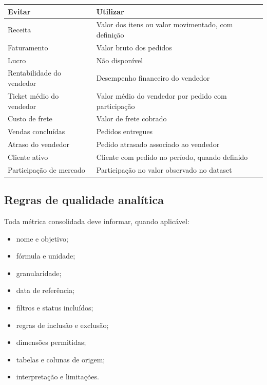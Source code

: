 \documentclass[12pt,a4paper]{article}
\newcounter{none}
\providecommand{\tightlist}{
  \setlength{\itemsep}{0pt}\setlength{\parskip}{0pt}
}
\begin{document}
{\def\LTcaptype{none} %
\begin{longtable}[]{@{}
  >{\raggedright\arraybackslash}p{}
  >{\raggedright\arraybackslash}p{}@{}}
\toprule\noalign{}
\rowcolor{AzulCorporativo}
\begin{minipage}[b]{\linewidth}\raggedright\color{white}\bfseries
Evitar
\end{minipage} & \begin{minipage}[b]{\linewidth}\raggedright\color{white}\bfseries
Utilizar
\end{minipage} \\
\midrule\noalign{}
\endhead
\bottomrule\noalign{}
\endlastfoot
Receita & Valor dos itens ou valor movimentado, com definição \\
Faturamento & Valor bruto dos pedidos \\
Lucro & Não disponível \\
Rentabilidade do vendedor & Desempenho financeiro do vendedor \\
Ticket médio do vendedor & Valor médio do vendedor por pedido com
participação \\
Custo de frete & Valor de frete cobrado \\
Vendas concluídas & Pedidos entregues \\
Atraso do vendedor & Pedido atrasado associado ao vendedor \\
Cliente ativo & Cliente com pedido no período, quando definido \\
Participação de mercado & Participação no valor observado no dataset \\
\end{longtable}
}

\subsection{Regras de qualidade
analítica}\label{docs__analytics__contrato_analitico.md__regras-de-qualidade-analuxedtica}

Toda métrica consolidada deve informar, quando aplicável:

\begin{itemize}
\tightlist
\item
  nome e objetivo;
\item
  fórmula e unidade;
\item
  granularidade;
\item
  data de referência;
\item
  filtros e status incluídos;
\item
  regras de inclusão e exclusão;
\item
  dimensões permitidas;
\item
  tabelas e colunas de origem;
\item
  interpretação e limitações.
\end{itemize}
\end{document}
